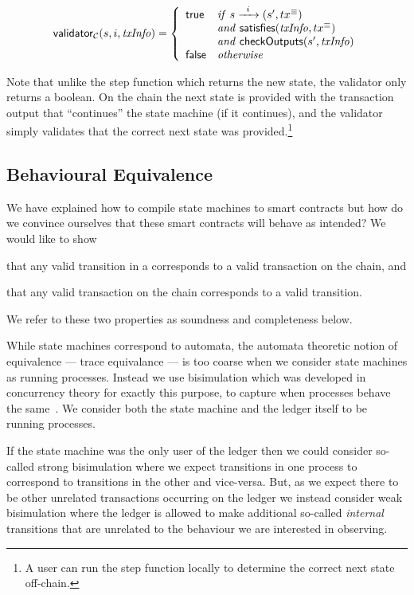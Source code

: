 \[
\mathsf{validator}_\mathcal{C}(s, i, \mathit{txInfo}) = \left\{
  \begin{array}{lll}
  \textsf{true}  & \mathit{if} \  s \xrightarrow{\hspace{5pt} i \hspace{5pt}} (s' , tx^\equiv)  \\
         & \mathit{and} \ \mathsf{satisfies}(\mathit{txInfo}, tx^\equiv) \\
         & \mathit{and} \ \mathsf{checkOutputs}(s', \mathit{txInfo}) \\
  \textsf{false} & \mathit{otherwise}
  \end{array}
\right.
\]

\noindent
Note that unlike the step function which returns the new state, the
validator only returns a boolean. On the chain the next state is
provided with the transaction output that ``continues'' the state
machine (if it continues), and the validator simply validates that
the correct next state was provided.\footnote{
A user can run the step function locally to determine the correct next state off-chain.
}

\subsection{Behavioural Equivalence}
We have explained how to compile state machines to smart contracts but
how do we convince ourselves that these smart contracts will behave as
intended? We would like to show
\begin{inparaenum}[(1)]
\item that any valid transition in a \CEM{} corresponds to a valid transaction
  on the chain, and
\item that any valid transaction on the chain corresponds to a valid transition.
\end{inparaenum}
We refer to these two properties as soundness and completeness below.

While state machines correspond to automata, the automata theoretic
notion of equivalence --- trace equivalance --- is too coarse when we
consider state machines as running processes. Instead we use
bisimulation which was developed in concurrency theory for exactly
this purpose, to capture when processes behave the
same~\cite{sangiorgi}. We consider both the state machine and the
ledger itself to be running processes.

If the state machine was the only user of the ledger then we could
consider so-called strong bisimulation where we expect transitions in
one process to correspond to transitions in the other and
vice-versa. But, as we expect there to be other unrelated transactions
occurring on the ledger we instead consider weak bisimulation where
the ledger is allowed to make additional so-called \emph{internal}
transitions that are unrelated to the behaviour we are interested in
observing.

